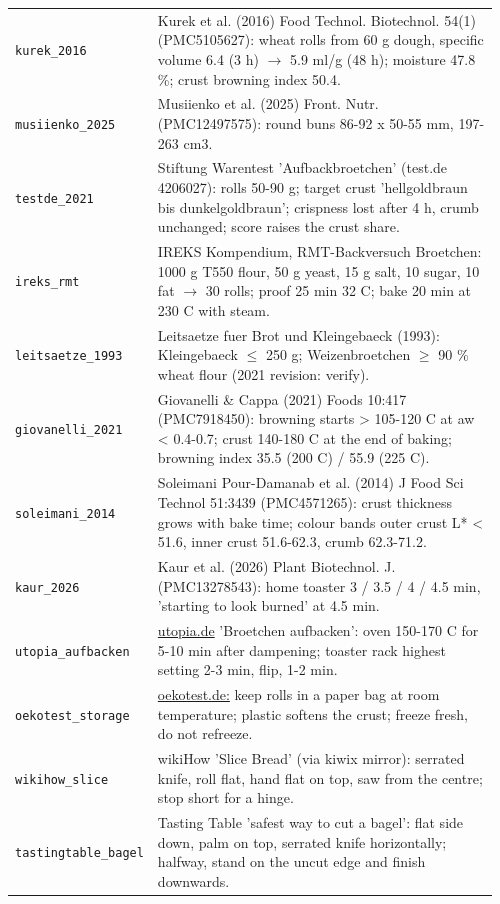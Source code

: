\documentclass[10.5pt,a4paper]{article}
\begin{document}
{\begin{longtable}{@{}p{0.16\linewidth}p{0.8\linewidth}@{}}
\texttt{kurek\_\allowbreak{}2016} & Kurek et al. (2016) Food Technol. Biotechnol. 54(1) (PMC5105627): wheat rolls from 60 g dough, specific volume 6.4 (3 h) $\to$ 5.9 ml/g (48 h); moisture 47.8 \%; crust browning index 50.4. \\
\texttt{musiienko\_\allowbreak{}2025} & Musiienko et al. (2025) Front. Nutr. (PMC12497575): round buns 86-92 x 50-55 mm, 197-263 cm3. \\
\texttt{testde\_\allowbreak{}2021} & Stiftung Warentest 'Aufbackbroetchen' (test.de 4206027): rolls 50-90 g; target crust 'hellgoldbraun bis dunkelgoldbraun'; crispness lost after 4 h, crumb unchanged; score raises the crust share. \\
\texttt{ireks\_\allowbreak{}rmt} & IREKS Kompendium, RMT-Backversuch Broetchen: 1000 g T550 flour, 50 g yeast, 15 g salt, 10 sugar, 10 fat $\to$ 30 rolls; proof 25 min 32 C; bake 20 min at 230 C with steam. \\
\texttt{leitsaetze\_\allowbreak{}1993} & Leitsaetze fuer Brot und Kleingebaeck (1993): Kleingebaeck $\le$ 250 g; Weizenbroetchen $\ge$ 90 \% wheat flour (2021 revision: verify). \\
\texttt{giovanelli\_\allowbreak{}2021} & Giovanelli \& Cappa (2021) Foods 10:417 (PMC7918450): browning starts > 105-120 C at aw < 0.4-0.7; crust 140-180 C at the end of baking; browning index 35.5 (200 C) / 55.9 (225 C). \\
\texttt{soleimani\_\allowbreak{}2014} & Soleimani Pour-Damanab et al. (2014) J Food Sci Technol 51:3439 (PMC4571265): crust thickness grows with bake time; colour bands outer crust L* < 51.6, inner crust 51.6-62.3, crumb 62.3-71.2. \\
\texttt{kaur\_\allowbreak{}2026} & Kaur et al. (2026) Plant Biotechnol. J. (PMC13278543): home toaster 3 / 3.5 / 4 / 4.5 min, 'starting to look burned' at 4.5 min. \\
\texttt{utopia\_\allowbreak{}aufbacken} & \url{utopia.de} 'Broetchen aufbacken': oven 150-170 C for 5-10 min after dampening; toaster rack highest setting 2-3 min, flip, 1-2 min. \\
\texttt{oekotest\_\allowbreak{}storage} & \url{oekotest.de:} keep rolls in a paper bag at room temperature; plastic softens the crust; freeze fresh, do not refreeze. \\
\texttt{wikihow\_\allowbreak{}slice} & wikiHow 'Slice Bread' (via kiwix mirror): serrated knife, roll flat, hand flat on top, saw from the centre; stop short for a hinge. \\
\texttt{tastingtable\_\allowbreak{}bagel} & Tasting Table 'safest way to cut a bagel': flat side down, palm on top, serrated knife horizontally; halfway, stand on the uncut edge and finish downwards. \\

\end{longtable}}
\end{document}

